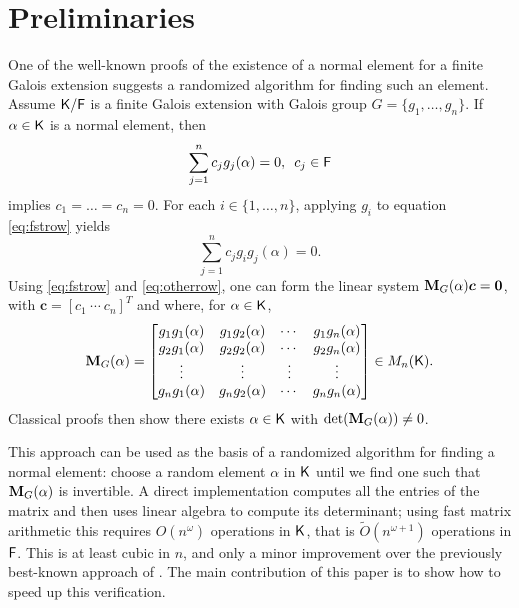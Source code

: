 \section{Preliminaries}
\label{sec:pre}

One of the well-known proofs of the existence of a normal element for a
finite Galois extension \cite[Theorem 6.13.1]{Lang} suggests a randomized
algorithm for finding such an element. Assume ${\mathsf{K}}/{\mathsf{F}}$ is a finite Galois
extension with Galois group $G = \lbrace g_1 , \ldots , g_n \rbrace$. If
$\alpha \in {\mathsf{K}}$ is a normal element, then
\begin{equation}
  \label{eq:fstrow}
  \sum_{j=1}^n 
  c_j g_j(\alpha)=0, \,\,\, c_j \in {\mathsf{F}} 
\end{equation} 
implies $c_1 =\dots=c_n = 0$. For each
$i \in \lbrace 1, \ldots , n\rbrace$, applying $g_i$ to equation
\eqref{eq:fstrow} yields
\begin{equation} \label{eq:otherrow} \sum_{j=1}^n c_j g_i g_j(\alpha)=0.
\end{equation}
Using \eqref{eq:fstrow} and \eqref{eq:otherrow}, one can form the linear
system $\mat{M}_G(\alpha)\boldsymbol{c} = \textbf{0}$,
with $\boldsymbol{c} = [ c_1~ \cdots~c_n]^T$ and
 where, for $\alpha\in{\mathsf{K}}$,
\[
  \mat M_G(\alpha) =
  \begin{bmatrix}
    g_1 g_1(\alpha) & g_1 g_2(\alpha) & \cdots & g_1 g_n(\alpha) \\
    g_2 g_1(\alpha) & g_2 g_2(\alpha) & \cdots & g_2 g_n(\alpha) \\
    \vdots		& \vdots	& \vdots & \vdots \\
    g_n g_1(\alpha) & g_n g_2(\alpha) & \cdots & g_n g_n(\alpha) \\
  \end{bmatrix} \in M_n(\K).
\]
Classical proofs then show there exists $\alpha \in {\mathsf{K}}$
with $\det(\mat M_G(\alpha))\neq 0$.
 
This approach can be used as the basis of a randomized algorithm for
finding a normal element: choose a random element $\alpha$ in ${\mathsf{K}}$ until we
find one such that $ \mat M_G(\alpha)$ is invertible. A direct implementation computes
all the entries of the matrix and then uses linear algebra to compute its
determinant; using fast matrix arithmetic this requires $O(n^\omega)$
operations in ${\mathsf{K}}$, that is $\tilde{O}(n^{\omega+1})$ operations in
${\mathsf{F}}$. This is at least cubic in $n$, and only a minor improvement over the
previously best-known approach of . The main contribution
of this paper is to show how to speed up this verification.
 
